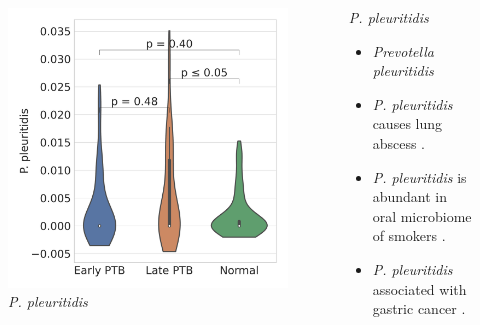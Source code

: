 \documentclass{beamer}
\begin{document}
\begin{frame}[allowframebreaks]
        \begin{columns}
            \begin{column}{0.4 \linewidth}
                \begin{figure}
                    \includegraphics[width=\linewidth]{figures/Step71_Proportion/everything.DADA2.homd.Mouth/P. pleuritidis.pdf}
                    \caption{\textit{P. pleuritidis}}
                \end{figure}
            \end{column}
            \begin{column}{0.6 \linewidth}
                \begin{block}{\textit{P. pleuritidis}}
                    \begin{itemize}
                        \item \textit{Prevotella pleuritidis}
                        \item \textit{P. pleuritidis} causes lung abscess \cite{Prevotella-5}.
                        \item \textit{P. pleuritidis} is abundant in oral microbiome of smokers \cite{Prevotella-6}.
                        \item \textit{P. pleuritidis} associated with gastric cancer \cite{Prevotella-7}.
                    \end{itemize}
                \end{block}
            \end{column}
        \end{columns}
    \end{frame}
\end{document}
